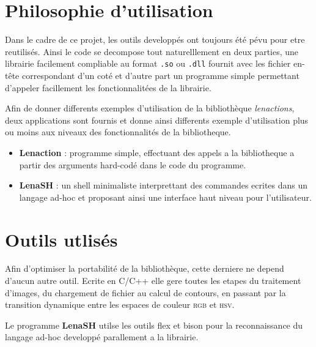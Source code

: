 
\usepackage{subfigure}
\usepackage{hyperref}
\usepackage{draftwatermark}


\maketitle

\section*{Philosophie d'utilisation}
Dans le cadre de ce projet, les outils developpés ont toujours été pévu pour etre reutilisés. Ainsi le code se decompose tout naturelllement en deux parties, une librairie facilement compliable au format \texttt{.so} ou \texttt{.dll} fournit avec les fichier en-tête correspondant d'un coté et d'autre part un programme simple permettant d'appeler facillement les fonctionnalitées de la librairie.

Afin de donner differents exemples d'utilisation de la bibliothèque \emph{lenactions}, deux applications sont fournis et donne ainsi differents exemple d'utilisation plus ou moins aux niveaux des fonctionnalités de la bibliotheque.
\begin{itemize}
	\item \textbf{Lenaction} : programme simple, effectuant des appels a la bibliotheque a partir des arguments hard-codé dans le code du programme.
	\item \textbf{LenaSH} : un shell minimaliste interprettant des commandes ecrites dans un langage ad-hoc et proposant ainsi une interface haut niveau pour l'utilisateur.
\end{itemize}

\section*{Outils utlisés}
Afin d'optimiser la portabilité de la bibliothèque, cette derniere ne depend d'aucun autre outil. Ecrite en C/C++ elle gere toutes les etapes du traitement d'images, du chargement de fichier au calcul de contours, en passant par la transition dynamique entre les espaces de couleur \textsc{rgb} et \textsc{hsv}.

Le programme \textbf{LenaSH} utilse les outils flex et bison pour la reconnaissance du langage ad-hoc developpé parallement a la librairie.

